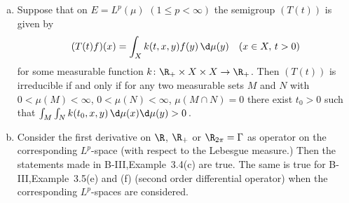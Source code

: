 \begin{examples}\label{ex:c3-3.4}
	\begin{enumerate}[(a), wide]
	\item 
	Suppose that on $E = L^{p}(\mu)$ $(1 \leq p < \infty)$ the semigroup $(T(t))$ is given by
	\begin{equation}\label{eq:c3-3.1}
		(T(t)f)(x) = \int_{X} k(t,x,y)f(y)\,\d\mu(y) \quad (x \in X,\, t > 0)
	\end{equation}
	for some measurable function $k \colon \R _{+} \times X \times X \to \R _{+}$.
	Then $(T(t))$ is irreducible if and only if for any two measurable sets $M$ and $N$ with $0 < \mu(M) < \infty$, $0 < \mu(N) < \infty$, $\mu(M\cap N) = 0$ there exist $t_{0} > 0$ such that $\int_{M}\int_{N} k(t_{0},x,y)\,\d\mu(x)\d\mu(y) > 0$\,.
	
	\item 
	Consider the first derivative on $\R $, $\R _{+}$ or $\R _{2\pi} = \Gamma$ as operator on the corresponding $L^{p}$-space (with respect to the Lebesgue measure.)
	Then the statements made in B-III,Example~3.4(c) are true.
	The same is true for B-III,Example~3.5(e) and (f) (second order differential operator) when the corresponding $L^{p}$-spaces are considered.
	

\end{enumerate}
\end{examples}
